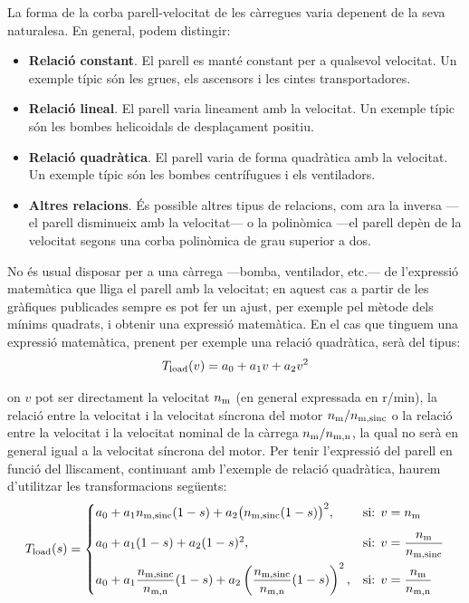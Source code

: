 La forma de la corba parell-velocitat de les càrregues varia depenent de la seva naturalesa. En general, podem distingir:
\begin{itemize}
	\item  \textbf{Relació constant}. El parell es manté constant per a qualsevol velocitat. Un exemple típic són les grues, els ascensors i les cintes transportadores.
	
	\item  \textbf{Relació lineal}. El parell varia lineament amb la velocitat. Un exemple típic són les bombes helicoidals de desplaçament positiu.
	
	\item  \textbf{Relació quadràtica}. El parell varia de forma  quadràtica  amb la velocitat. Un exemple típic són les bombes centrífugues i els ventiladors.
	
	\item  \textbf{Altres relacions}. És possible altres tipus de relacions, com ara la inversa ---el parell disminueix amb la velocitat--- o la polinòmica ---el parell depèn de la velocitat segons una corba polinòmica de grau superior a dos.
\end{itemize}

No és  usual disposar per a una càrrega ---bomba, ventilador, etc.---   de l'expressió matemàtica que lliga el parell amb la velocitat; en aquest cas a partir de les gràfiques publicades sempre es pot fer un ajust, per exemple pel mètode dels mínims quadrats, i obtenir una expressió matemàtica. En el cas que tinguem una expressió matemàtica, prenent per exemple una relació quadràtica, serà del tipus:
\begin{equation}
	T_\mathrm{load}(v) = a_0 + a_1 v + a_2 v^2
\end{equation}

on $v$ pot ser directament la velocitat $n_\mathrm{m}$ (en general expressada en r/min),  la relació entre la velocitat i la velocitat síncrona del motor $n_\mathrm{m}/n_\mathrm{m,sinc}$ o la relació entre la velocitat i la velocitat nominal de la càrrega $n_\mathrm{m}/n_\mathrm{m,n}$, la qual no serà en general igual a la velocitat síncrona del motor. Per  tenir l'expressió del parell en funció del lliscament,  continuant amb l'exemple de relació quadràtica, haurem d'utilitzar les transformacions següents:
\begin{equation}\label{eq:Tload-v-s}
	T_\mathrm{load}(s) = \begin{cases}
		 a_0 + a_1 n_\mathrm{m,sinc}(1-s) + a_2 \big(n_\mathrm{m,sinc}(1-s)\big)^2,  & \text{si: } v=n_\mathrm{m}  \\[2ex]
		a_0 + a_1 (1-s) + a_2 (1-s)^2, &   
		\text{si: } v =\dfrac{n_\mathrm{m}}{n_\mathrm{m,sinc}} \\[2ex]
		 a_0 + a_1 \dfrac{n_\mathrm{m,sinc}}{n_\mathrm{m,n}}(1-s) + a_2 \left(\dfrac{n_\mathrm{m,sinc}}{n_\mathrm{m,n}}(1-s)\right)^2, &  \text{si: }  v = \dfrac{n_\mathrm{m}}{n_\mathrm{m,n}}
	\end{cases}
\end{equation}


